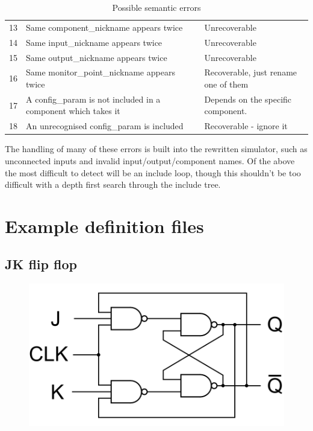 \documentclass[a4paper]{article}
\begin{document}
\begin{table}[h]
\begin{tabular}{p{0.5cm}p{8cm}p{4cm}}
                13     & Same component\_nickname appears twice                                   & Unrecoverable                                        \\
                14     & Same input\_nickname appears twice                                       & Unrecoverable                                        \\
                15     & Same output\_nickname appears twice                                      & Unrecoverable                                        \\
                16     & Same monitor\_point\_nickname appears twice                              & Recoverable, just rename one of them                 \\
                17     & A config\_param is not included in a component which takes it            & Depends on the specific component.                   \\
                18     & An unrecognised config\_param is included                                & Recoverable - ignore it                              \\ \bottomrule
            \end{tabular}
            \caption{Possible semantic errors}
            \label{tab:semantic-errors}
        \end{table}

        The handling of many of these errors is built into the rewritten simulator, such as unconnected inputs and invalid input/output/component names. Of the above the most difficult to detect will be an include loop, though this shouldn't be too difficult with a depth first search through the include tree.

\section{Example definition files}
    \subsection{JK flip flop}
        

        \begin{figure}
            \centering
            \includegraphics[width=.7\textwidth]{images/jkflipflop_schematic}
        \end{figure}
\end{document}
